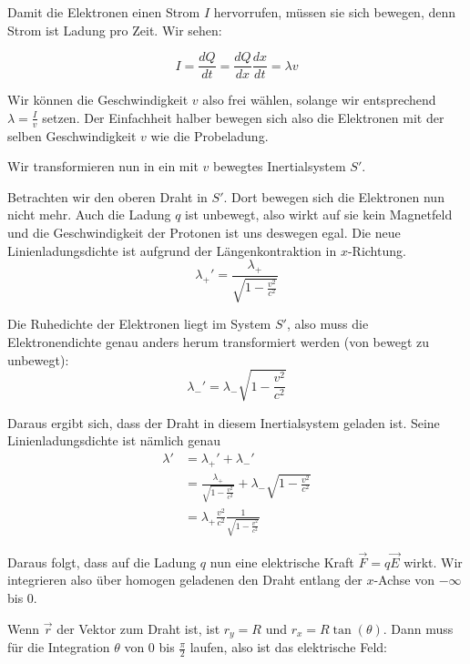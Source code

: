 \documentclass[a4paper,german,12pt,smallheadings]{scrartcl}
\begin{document}
Damit die Elektronen einen Strom $I$ hervorrufen, müssen sie sich bewegen, denn
Strom ist Ladung pro Zeit. Wir sehen:

\begin{equation}
  I = \frac{dQ}{dt} = \frac{dQ}{dx} \frac{dx}{dt} = \lambda v
\end{equation}

Wir können die Geschwindigkeit $v$ also frei wählen, solange wir entsprechend
$\lambda = \frac{I}{v}$ setzen. Der Einfachheit halber bewegen sich also die
Elektronen mit der selben Geschwindigkeit $v$ wie die Probeladung.

Wir transformieren nun in ein mit $v$ bewegtes Inertialsystem $S'$.

Betrachten wir den oberen Draht in $S'$. Dort bewegen sich die Elektronen nun
nicht mehr. Auch die Ladung $q$ ist unbewegt, also wirkt auf sie kein
Magnetfeld und die Geschwindigkeit der Protonen ist uns deswegen egal. Die neue
Linienladungsdichte ist aufgrund der Längenkontraktion in $x$-Richtung.
\begin{equation}
  \lambda_+' = \frac{\lambda_+}{\sqrt{1 - \frac{v^2}{c^2}}}
\end{equation}

Die Ruhedichte der Elektronen liegt im System $S'$, also muss die
Elektronendichte genau anders herum transformiert werden (von bewegt zu
unbewegt):
\begin{equation}
  \lambda_-' = \lambda_- \sqrt{1 - \frac{v^2}{c^2}}
\end{equation}

Daraus ergibt sich, dass der Draht in diesem Inertialsystem geladen ist. Seine
Linienladungsdichte ist nämlich genau
\begin{align*}
  \lambda' &= \lambda_+' + \lambda_-' \\
       &= \frac{\lambda_+}{\sqrt{1 - \frac{v^2}{c^2}}} + \lambda_- \sqrt{1 - \frac{v^2}{c^2}} \\
       &= \lambda_{+} \frac{v^2}{c^2} \frac{1}{\sqrt{1-\frac{v^2}{c^2}}}
\end{align*}

Daraus folgt, dass auf die Ladung $q$ nun eine elektrische Kraft $\vec{F} = q
\vec{E}$ wirkt. Wir integrieren also über homogen geladenen den Draht entlang
der $x$-Achse von $-\infty$ bis $0$.

Wenn $\vec{r}$ der Vektor zum Draht ist, ist $r_y = R$ und $r_x = R
\tan(\theta)$. Dann muss für die Integration $\theta$ von $0$ bis
$\frac{\pi}{2}$ laufen, also ist das elektrische Feld:
\end{document}
